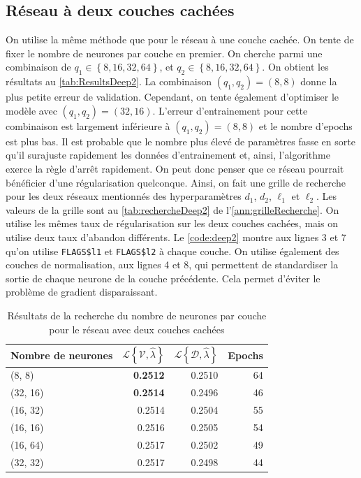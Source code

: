 \subsection{Réseau à deux couches cachées}
\label{subsec:deep2}

On utilise la même méthode que pour le réseau à une couche cachée. On tente de fixer le nombre de neurones par couche en premier. On cherche parmi une combinaison de $q_1 \in \left\{ 8, 16, 32, 64 \right\}$, et $q_2\in \left\{8,16,32,64 \right\}$. On obtient les résultats au \autoref{tab:ResultsDeep2}. La combinaison $(q_1,q_2) = (8,8)$ donne la plus petite erreur de validation. Cependant, on tente également d'optimiser le modèle avec $(q_1,q_2)=(32,16)$. L'erreur d'entrainement pour cette combinaison est largement inférieure à $(q_1,q_2) = (8,8)$ et le nombre d'epochs est plus bas. Il est probable que le nombre plus élevé de paramètres fasse en sorte qu'il surajuste rapidement les données d'entrainement et, ainsi, l'algorithme exerce la règle d'arrêt rapidement. On peut donc penser que ce réseau pourrait bénéficier d'une régularisation quelconque. Ainsi, on fait une grille de recherche pour les deux réseaux mentionnés des hyperparamètres $d_1$, $d_2$, $\ell_1$ et $\ell_2$. Les valeurs de la grille sont au \autoref{tab:rechercheDeep2} de l'\autoref{ann:grilleRecherche}. On utilise les mêmes taux de régularisation sur les deux couches cachées, mais on utilise deux taux d'abandon différents.  Le \autoref{code:deep2} montre aux lignes  3 et 7 qu'on utilise \verb=FLAGS$l1= et \verb=FLAGS$l2= à chaque couche. On utilise également des couches de normalisation, aux lignes 4 et 8, qui permettent de standardiser la sortie de chaque neurone de la couche précédente. Cela permet d'éviter le problème de gradient disparaissant.%


\begin{table}
\centering
\caption{\label{tab:ResultsDeep2} Résultats de la recherche du nombre de neurones par couche pour le réseau avec deux couches cachées}
\begin{tabularx}{0.6\textwidth}{Xrrr}
\toprule
Nombre \newline de neurones & $\mathcal{L}\left\{\mathcal{V},\hat{\lambda} \right\} $ & $\mathcal{L}\left\{\mathcal{D},\hat{\lambda} \right\} $ & Epochs\\
\midrule
(8, 8) & \textbf{0.2512} & 0.2510 & 64\\
(32, 16) & \textbf{0.2514} & 0.2496 & 46\\
(16, 32) & 0.2514 & 0.2504 & 55\\
(16, 16) & 0.2516 & 0.2505 & 54\\
(16, 64) & 0.2517 & 0.2502 & 49\\
(32, 32) & 0.2517 & 0.2498 & 44\\
\bottomrule
\end{tabularx}
\end{table}

